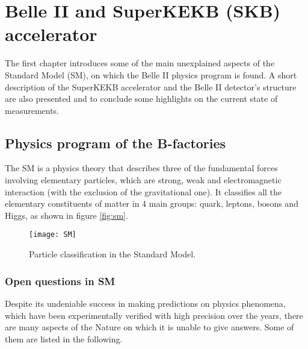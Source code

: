 
\chapter{Belle II and SuperKEKB (SKB) accelerator}

The first chapter introduces some of the main unexplained aspects of the Standard Model (SM), on which the Belle II physics program is found. A short description of the SuperKEKB accelerator and the Belle II detector's structure are also presented and to conclude some highlights on the current state of measurements.


\section{Physics program of the B-factories}

The SM is a physics theory that describes three of the fundamental forces involving elementary particles, which are strong, weak and electromagnetic interaction (with the exclusion of the gravitational one). It classifies all the elementary constituents of matter in 4 main groups: quark, leptons, bosons and Higgs, as shown in figure \vref{fig:sm}.


\begin{figure}[h]
\centering
\texttt{[image: SM]}
\caption{Particle classification in the Standard Model.}
\label{fig:sm}
\end{figure}




\subsection{Open questions in SM}


Despite its undeniable success in making predictions on physics phenomena, which have been experimentally verified with high precision over the years, there are many aspects of the Nature on which it is unable to give answers. Some of them are listed in the following.

